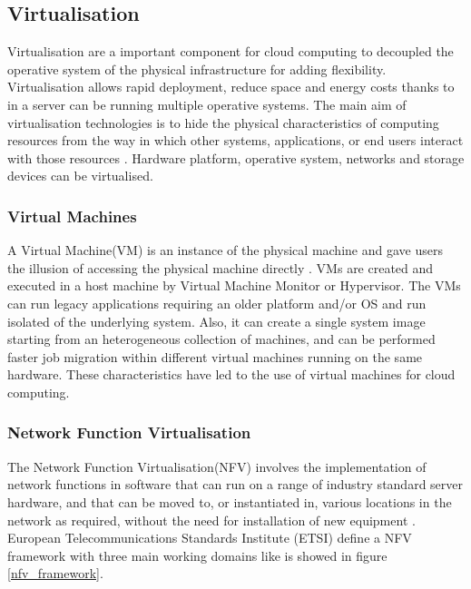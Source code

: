 \subsection{Virtualisation}

Virtualisation are a important component for cloud computing to decoupled the operative system of the physical infrastructure for adding flexibility. Virtualisation allows rapid deployment, reduce space and energy costs thanks to in a server can be running multiple operative systems. The main aim of virtualisation technologies 
is to hide the physical characteristics of computing resources from the way in which other systems, applications, or end users interact with those resources \cite{virtualization}. Hardware platform, operative system, networks and storage devices can be virtualised. 

\subsubsection{Virtual Machines}
A Virtual Machine(VM) is an instance of the physical machine and gave users the illusion of accessing the physical machine directly \cite{virtualization}. VMs are created and executed in a host machine by Virtual Machine Monitor or Hypervisor. The VMs can run legacy applications requiring an older platform and/or OS and run isolated of the underlying system. Also, it can create a single system image starting from an heterogeneous collection of machines, and can be performed faster job migration within different virtual machines running on the same hardware. These characteristics have led to the use of virtual machines for cloud computing. 

\subsubsection{Network Function Virtualisation}
The Network Function Virtualisation(NFV) involves the implementation of network functions in software that can run on a range of industry standard server hardware, and that can be moved to, or instantiated in, various locations in the network as required, without the need for installation of new equipment \cite{nfv}. European Telecommunications Standards Institute (ETSI) define a NFV framework \cite{nfv_framework} with three main working domains like is showed in figure \ref{nfv_framework}. 


